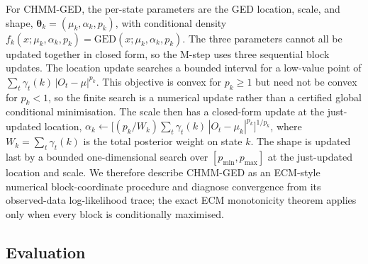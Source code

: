 For CHMM-GED, the per-state parameters are the GED location, scale, and shape, $\boldsymbol\theta_k = (\mu_k, \alpha_k, p_k)$, with conditional density $f_k(x; \mu_k, \alpha_k, p_k) = \mathrm{GED}(x; \mu_k, \alpha_k, p_k)$. The three parameters cannot all be updated together in closed form, so the M-step uses three sequential block updates. The location update searches a bounded interval for a low-value point of $\sum_t \gamma_t(k)\,|O_t - \mu|^{p_k}$. This objective is convex for $p_k \ge 1$ but need not be convex for $p_k < 1$, so the finite search is a numerical update rather than a certified global conditional minimisation. The scale then has a closed-form update at the just-updated location, $\alpha_k \leftarrow \big[(p_k / W_k) \sum_t \gamma_t(k)\,|O_t - \mu_k|^{p_k}\big]^{1/p_k}$, where $W_k = \sum_t \gamma_t(k)$ is the total posterior weight on state $k$. The shape is updated last by a bounded one-dimensional search over $[p_{\min}, p_{\max}]$ at the just-updated location and scale. We therefore describe CHMM-GED as an ECM-style numerical block-coordinate procedure and diagnose convergence from its observed-data log-likelihood trace; the exact ECM monotonicity theorem applies only when every block is conditionally maximised.

\subsection{Evaluation}
\label{sec:evaluation}

